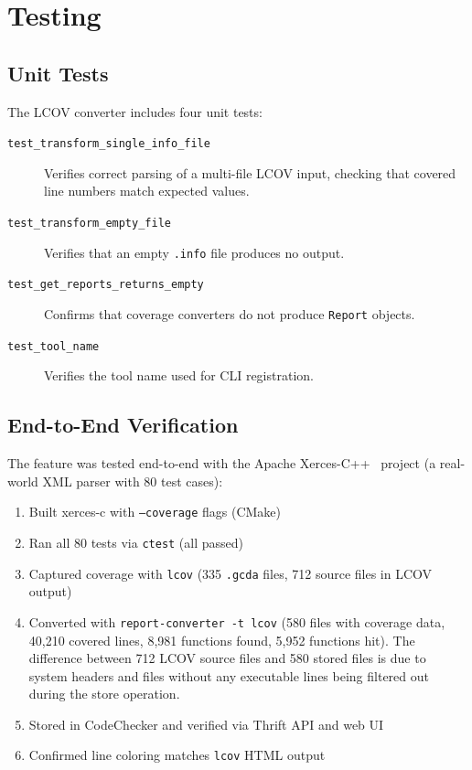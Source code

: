 \section{Testing}

\subsection{Unit Tests}

The LCOV converter includes four unit tests:

\begin{description}
    \item[\texttt{test\_transform\_single\_info\_file}] Verifies correct parsing of a multi-file LCOV input, checking that covered line numbers match expected values.
    \item[\texttt{test\_transform\_empty\_file}] Verifies that an empty \texttt{.info} file produces no output.
    \item[\texttt{test\_get\_reports\_returns\_empty}] Confirms that coverage converters do not produce \texttt{Report} objects.
    \item[\texttt{test\_tool\_name}] Verifies the tool name used for CLI registration.
\end{description}

\subsection{End-to-End Verification}

The feature was tested end-to-end with the Apache Xerces-C++~\cite{xerces} project (a real-world XML parser with 80 test cases):

\begin{enumerate}
    \item Built xerces-c with \texttt{--coverage} flags (CMake)
    \item Ran all 80 tests via \texttt{ctest} (all passed)
    \item Captured coverage with \texttt{lcov} (335 \texttt{.gcda} files, 712 source files in LCOV output)
    \item Converted with \texttt{report-converter -t lcov} (580 files with coverage data, 40,210 covered lines, 8,981 functions found, 5,952 functions hit). The difference between 712 LCOV source files and 580 stored files is due to system headers and files without any executable lines being filtered out during the store operation.
    \item Stored in CodeChecker and verified via Thrift API and web UI
    \item Confirmed line coloring matches \texttt{lcov} HTML output
\end{enumerate}

